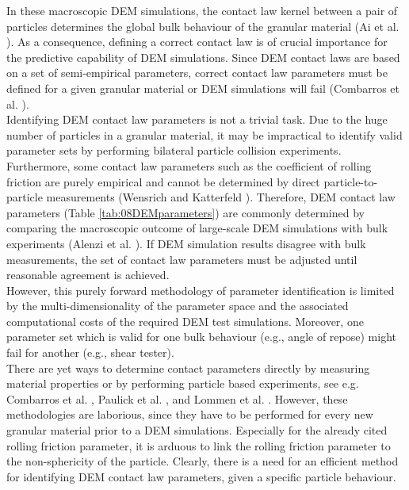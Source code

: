In these macroscopic \acs{DEM} simulations, the contact law kernel between a 
pair of particles determines the global bulk behaviour of the granular material (Ai et al. \cite{RefWorks:131}). 
As a consequence, defining a correct contact law is of crucial importance for the predictive 
capability of \acs{DEM} simulations. 
Since \acs{DEM} contact laws are based 
on a set of semi-empirical parameters, correct contact law 
parameters must be defined for a given granular material
or \acs{DEM} simulations will fail (Combarros et al. \cite{RefWorks:177}). \\
Identifying \acs{DEM} contact law parameters is not a trivial task. 
Due to the huge number of particles in a granular material, it
may be impractical to identify valid parameter sets by performing bilateral 
particle collision experiments. 
Furthermore, some contact law parameters such as the coefficient of rolling
friction are purely empirical and cannot be determined by direct 
particle-to-particle measurements (Wensrich and Katterfeld \cite{RefWorks:87}).
Therefore, \acs{DEM} contact law parameters (Table \ref{tab:08DEMparameters}) are
commonly determined by comparing the macroscopic outcome of large-scale \acs{DEM}
simulations with bulk experiments (Alenzi et al. \cite{RefWorks:91}). 
If \acs{DEM} simulation results disagree with bulk measurements, the set of contact
law parameters must be adjusted until reasonable agreement is achieved.\\
However, this purely forward methodology of parameter identification is limited by 
the multi-dimensionality of the parameter space and the associated computational costs of the required 
\acs{DEM} test simulations. 
Moreover, one parameter set which is valid for one bulk behaviour (e.g., angle
of repose) might fail for another (e.g., shear tester). \\
There are yet ways to determine contact parameters directly by measuring
material properties or by performing particle based experiments, see e.g. Combarros et al. \cite{RefWorks:177}, 
Paulick et al. \cite{RefWorks:181}, and Lommen et al. \cite{RefWorks:186}. 
However, these methodologies are laborious, 
since they have to be performed for every new granular material prior to a \acs{DEM}
simulations. 
Especially for the already cited rolling friction parameter, it is arduous to
link the rolling friction parameter to the non-sphericity of the particle. Clearly, there is a
need for an efficient method for identifying \acs{DEM} contact law parameters, given
a specific particle behaviour.



